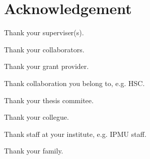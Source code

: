 \chapter*{Acknowledgement}

Thank your superviser(s).


Thank your collaborators.


Thank your grant provider.


Thank collaboration you belong to, e.g. HSC.


Thank your thesis commitee.


Thank your collegue.


Thank staff at your institute, e.g. IPMU staff.


Thank your family.

